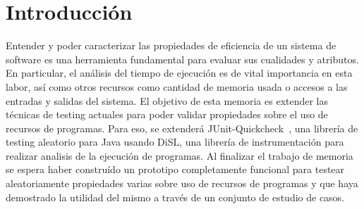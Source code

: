 \section{Introducción}
Entender y poder caracterizar las propiedades de eficiencia de un sistema de
software es una herramienta fundamental para evaluar sus cualidades y atributos.
En particular, el análisis del tiempo de ejecución es de vital importancia en
esta labor, así como otros recursos como cantidad de memoria usada o accesos a
las entradas y salidas del sistema. El objetivo de esta memoria es extender las
técnicas de testing actuales para poder validar propiedades sobre el uso de recursos de programas.
Para eso, se extenderá JUnit-Quickcheck~\cite{pholser}, una librería de testing aleatorio para
Java usando DiSL, una librería de instrumentación para realizar analisis de la
ejecución de programas.
Al finalizar el trabajo de memoria se espera haber construído
un prototipo completamente funcional para testear aleatoriamente propiedades
varias sobre uso de recursos de programas y que haya demostrado la utilidad del
mismo a través de un conjunto de estudio de casos.

